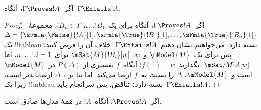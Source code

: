 \documentclass[../../../include/open-logic-section]{subfiles}
\begin{document}
\begin{cor}
اگر~$\Gamma \Proves !A$، آنگاه~$\Gamma \Entails !A$.
\end{cor}

\begin{proof}
  اگر~$\Gamma \Proves !A$، آنگاه برای یک~$!B_1$، \dots، $!B_n \in
  \Gamma$، مجموعهٔ~$\Delta = \{\sFmla{\False}{!A}[1],
  \sFmla{\True}{!B_1}[1], \dots, \sFmla{\True}{!B_n}[1]\}$ یک
  !!{tableau} بسته دارد. می‌خواهیم نشان دهیم~$\Gamma \Entails !A$.
  خلاف آن را فرض کنید؛ پس برای یک~$\mModel{M}$ و~$w$،
  $\mSat{M}{!B_i}[w]$ برای~$i=1$، \dots،~$n$، اما
  $\mSat/{M}{!A}[w]$. بگذارید~$f(1) = w$؛ آنگاه~$f$ تفسیری از
  $P(\Delta)$ در~$\mModel{M}$ است و~$\mModel{M}$، $\Delta$ را نسبت
  به~$f$ ارضا می‌کند. اما بنا بر ،
  $\Delta$ ارضاناپذیر است، زیرا یک !!{tableau} بسته دارد؛ تناقض. پس
  سرانجام باید~$\Gamma \Entails !A$.
\end{proof}

\begin{cor}
اگر~$\Proves !A$، آنگاه~$!A$ در همهٔ مدل‌ها صادق است.
\end{cor}
\end{document}
